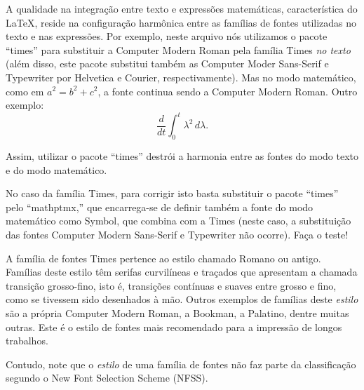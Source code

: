 \documentclass{article}
\begin{document}
	A qualidade na integração entre texto e expressões matemáticas, característica do \LaTeX, reside na configuração harmônica entre as famílias de fontes utilizadas no texto e nas expressões. Por exemplo, neste arquivo nós utilizamos o pacote ``times'' para substituir a Computer Modern Roman pela família Times \emph{no texto} (além disso, este pacote substitui também as Computer Moder Sans-Serif e Typewriter por Helvetica e Courier, respectivamente). Mas no modo matemático, como em $a^2 = b^2 + c^2$, a fonte continua sendo a Computer Modern Roman. Outro exemplo:		
	\[ %
	\frac{d}{dt}\int_0^t \lambda^2\, d\lambda.
	\] %

	Assim, utilizar o pacote ``times'' destrói a harmonia entre as fontes do modo texto e do modo matemático.
	
	No caso da família Times, para corrigir isto basta substituir o pacote ``times'' pelo ``mathptmx,'' que encarrega-se de definir também a fonte do modo matemático como Symbol, que combina com a Times (neste caso, a substituição das fontes Computer Modern Sans-Serif e Typewriter não ocorre). Faça o teste!
	
	A família de fontes Times pertence ao estilo chamado Romano ou antigo. Famílias deste estilo têm serifas curvilíneas e traçados que apresentam a chamada transição grosso-fino, isto é, transições contínuas e suaves entre grosso e fino, como se tivessem sido desenhados à mão. Outros exemplos de famílias deste \emph{estilo} são a própria Computer Modern Roman, a Bookman, a Palatino, dentre muitas outras. Este é o estilo de fontes mais recomendado para a impressão de longos trabalhos.
	
	Contudo, note que o \emph{estilo} de uma família de fontes não faz parte da classificação segundo o New Font Selection Scheme (NFSS).
\end{document}

